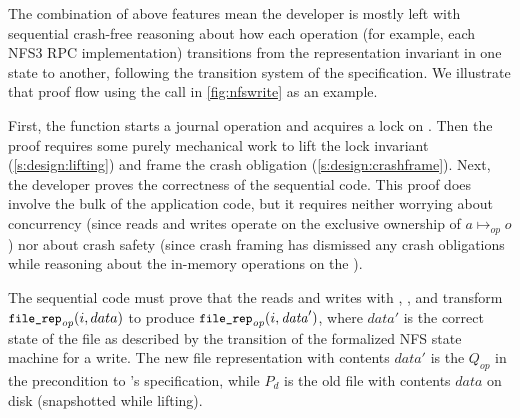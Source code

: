 The combination of above features mean the developer is mostly left with
sequential crash-free reasoning about how each operation (for example, each NFS3 RPC
implementation) transitions from the representation invariant in one state to
another, following the transition system of the specification. We
illustrate that proof flow using the  call in
\cref{fig:nfswrite} as an example.



First, the function starts a journal operation and acquires a lock on . Then the proof
requires some purely mechanical work to lift the lock invariant
(\cref{s:design:lifting}) and frame the crash obligation
(\cref{s:design:crashframe}). Next, the developer proves the correctness of
the sequential code. This proof does involve the bulk of the application code,
but it requires neither worrying about concurrency (since reads and writes
operate on the exclusive ownership of $a \mapsto_{\mathit{op}} o$) nor about crash safety
(since crash framing has dismissed any crash obligations while reasoning
about the in-memory operations on the ).

The sequential code must prove that the reads and writes with ,
, and  transform $\cc{file_rep}_{\mathit{op}}(i, data)$ to
produce $\cc{file_rep}_{\mathit{op}}(i, \mathit{data}')$, where $data'$ is the correct state of
the file as described by the transition of the formalized NFS state machine for a write. The new
file representation with contents $data'$ is the $Q_{\mathit{op}}$ in the precondition
to 's specification, while $P_{d}$ is the old file with contents
$\mathit{data}$ on disk (snapshotted while lifting).

